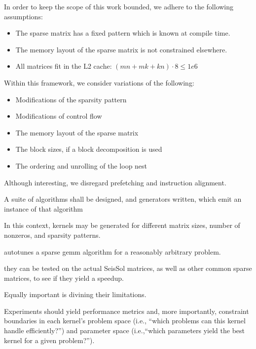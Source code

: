   In order to keep the scope of this work bounded, we adhere to the following assumptions:
  \begin{itemize}
    \item The sparse matrix has a fixed pattern which is known at compile time.
    \item The memory layout of the sparse matrix is not constrained elsewhere.
    \item All matrices fit in the L2 cache: $(mn + mk + kn)\cdot 8 \leq 1e6$
  \end{itemize}

  Within this framework, we consider variations of the following:
  \begin{itemize}
    \item Modifications of the sparsity pattern
    \item Modifications of control flow
    \item The memory layout of the sparse matrix
    \item The block sizes, if a block decomposition is used
    \item The ordering and unrolling of the loop nest
  \end{itemize}

  Although interesting, we disregard prefetching and instruction alignment. 
  

A suite of algorithms shall be designed, and generators written, which emit an instance of that algorithm 

In this context, kernels may be generated for different matrix sizes, number of nonzeros, and sparsity patterns. 

autotunes a sparse gemm algorithm for a reasonably arbitrary problem.



they can be tested on the actual SeisSol matrices, as well as other common sparse matrices, to see if they yield a speedup. 

Equally important is divining their limitations.

Experiments should yield performance metrics and, more importantly, constraint boundaries in each kernel's problem space (i.e., ``which problems can this kernel handle efficiently?'') and parameter space (i.e.,``which parameters yield the best kernel for a given problem?'').






   
